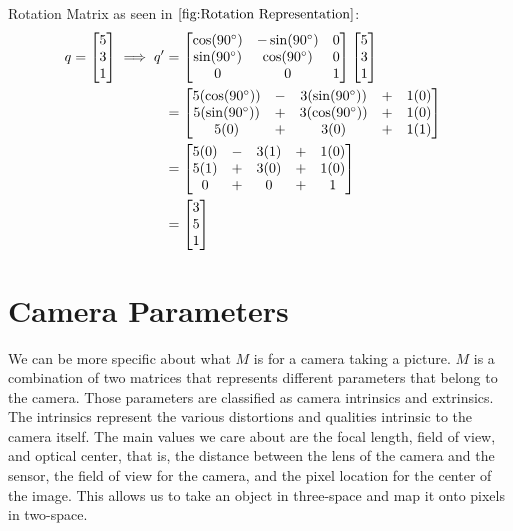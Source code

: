 \documentclass[
    12pt,
    twoside,
    bibstyle=chicago,
    headerstyle=uppercase,
	bibfile=thesis_updating.bib
]{reedthesis}
\begin{document}
Rotation Matrix as seen in $\ref{fig:Rotation Representation}$:
\begin{align*}	
q = \begin{bmatrix}5\\3\\1\end{bmatrix} \implies q' &= 
\begin{bmatrix}\cos(90\degree)&-\sin(90\degree)&0\\\sin(90\degree)&\cos(90\degree)&0\\0&0&1\end{bmatrix}
\begin{bmatrix}5\\3\\1\end{bmatrix}\\ &= 
\begin{bmatrix}5(\cos(90\degree)) &-& 3(\sin(90\degree)) &+& 1(0)\\5(\sin(90\degree)) &+& 3(\cos(90\degree)) &+& 1(0)\\5(0) &+& 3(0) &+& 1(1)\end{bmatrix}&\\ &=
\begin{bmatrix}5(0) &-& 3(1) &+& 1(0)\\5(1) &+& 3(0) &+& 1(0)\\0 &+& 0 &+& 1\end{bmatrix}\\ &= \begin{bmatrix}3\\5\\1\end{bmatrix}
\end{align*}

\section{Camera Parameters}

We can be more specific about what $M$ is for a camera taking a picture. $M$ is a combination of two matrices that represents different parameters that belong to the camera. Those parameters are classified as camera intrinsics and extrinsics. The intrinsics represent the various distortions and qualities intrinsic to the camera itself. The main values we care about are the focal length, field of view, and optical center, that is, the distance between the lens of the camera and the sensor, the field of view for the camera, and the pixel location for the center of the image. This allows us to take an object in three-space and map it onto pixels in two-space. 
\end{document}
